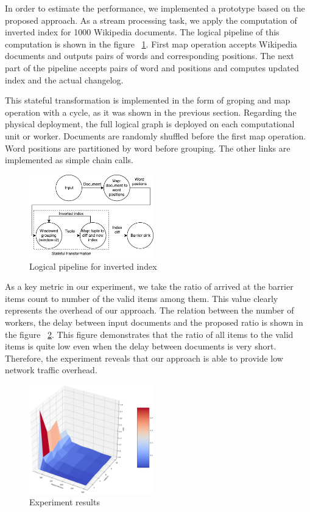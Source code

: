 
\label {fs-experiments}

In order to estimate the performance, we implemented a prototype based on  the proposed approach. As a stream processing task, we apply the computation of inverted index for 1000 Wikipedia documents. The logical pipeline of this computation is shown in the figure ~\ref{inverted-index}. First map operation accepts Wikipedia documents and outputs pairs of words and corresponding positions. The next part of the pipeline accepts pairs of word and positions and computes updated index and the actual changelog. 

This stateful transformation is implemented in the form of groping and map operation with a cycle, as it was shown in the previous section. Regarding the physical deployment, the full logical graph is deployed on each computational unit or worker. Documents are randomly shuffled before the first map operation. Word positions are partitioned by word before grouping. The other links are implemented as simple chain calls.

\begin{figure}[htbp]
  \centering
  \includegraphics[width=0.48\textwidth]{pics/inverted-index}
  \caption{Logical pipeline for inverted index}
  \label {inverted-index}
\end{figure}

As a key metric in our experiment, we take the ratio of arrived at the barrier items count to number of the valid items among them. This value clearly represents the overhead of our approach. The relation between the number of workers, the delay between input documents and the proposed ratio is shown in the figure ~\ref{experiment}. This figure demonstrates that the ratio of all items to the valid items is quite low even when the delay between documents is very short. Therefore, the experiment reveals that our approach is able to provide low network traffic overhead. 

\begin{figure}[htbp]
  \centering
  \includegraphics[width=0.48\textwidth]{pics/experiment}
  \caption{Experiment results}
  \label {experiment}
\end{figure}
